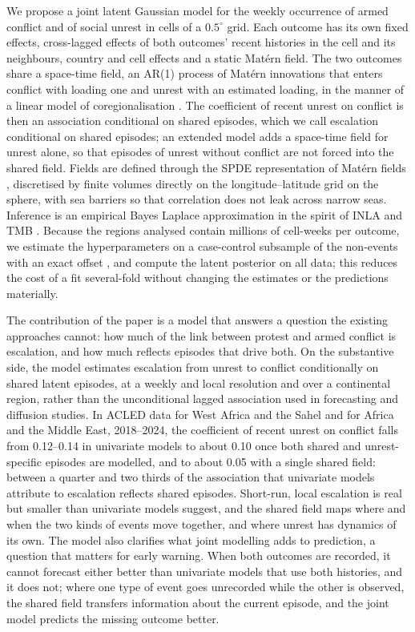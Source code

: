 We propose a joint latent Gaussian model \citep{rue2009inla} for the weekly
occurrence of armed conflict and of social unrest in cells of a $0.5^\circ$ grid. Each
outcome has its own fixed effects, cross-lagged effects of both outcomes' recent
histories in the cell and its neighbours, country and cell effects and a static
Mat\'ern field. The two outcomes share a space-time field, an AR(1) process of
Mat\'ern innovations \citep{cameletti2013pm10} that enters conflict with loading one
and unrest with an estimated loading, in the manner of a linear model of
coregionalisation \citep{gelfand2004nonstationary}. The coefficient of recent unrest
on conflict is then an association conditional on shared episodes, which we call
escalation conditional on shared episodes; an extended model adds a space-time field
for unrest alone, so that episodes of unrest without conflict are not forced into the
shared field. Fields are defined through the SPDE representation of Mat\'ern fields
\citep{lindgren2011spde}, discretised by finite volumes directly on the
longitude--latitude grid on the sphere, with sea barriers \citep{bakka2019barrier} so
that correlation does not leak across narrow seas. Inference is an empirical Bayes
Laplace approximation in the spirit of INLA and TMB \citep{rue2009inla,
kristensen2016tmb}. Because the regions analysed contain millions of cell-weeks per
outcome, we estimate the hyperparameters on a case-control subsample of the non-events
with an exact offset \citep{prentice1979logistic}, and compute the latent posterior on
all data; this reduces the cost of a fit several-fold without changing the estimates
or the predictions materially.

The contribution of the paper is a model that answers a question the existing
approaches cannot: how much of the link between protest and armed conflict is
escalation, and how much reflects episodes that drive both. On the substantive side,
the model estimates escalation from unrest to conflict conditionally on shared latent
episodes, at a weekly and local resolution and over a continental region, rather than
the unconditional lagged association used in forecasting and diffusion studies. In ACLED data for West Africa and the Sahel
and for Africa and the Middle East, 2018--2024, the coefficient of recent unrest on
conflict falls from 0.12--0.14 in univariate models to about 0.10 once both shared
and unrest-specific episodes are modelled, and to about 0.05 with a single shared
field: between a quarter and two thirds of the association that univariate models
attribute to escalation reflects shared episodes. Short-run, local escalation is real
but smaller than univariate models suggest, and the shared field maps where and when
the two kinds of events move together, and where unrest has dynamics of its own. The
model also clarifies what joint modelling adds to prediction, a question that matters
for early warning. When both outcomes are recorded, it cannot forecast either better
than univariate models that use both histories, and it does not; where one type of
event goes unrecorded while the other is observed, the shared field transfers
information about the current episode, and the joint model predicts the missing
outcome better.

